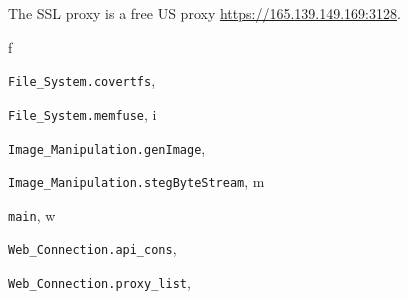\documentclass[letterpaper,10pt,english]{sphinxmanual}
\begin{document}
\begin{fulllineitems}
\label{Web_Connection:Web_Connection.proxy_list.ssl_proxy}
The SSL proxy is a free US proxy \href{https://165.139.149.169:3128}{https://165.139.149.169:3128}.

\end{fulllineitems}



\renewcommand{\indexname}{Python Module Index}
\begin{theindex}
\def\bigletter#1{{\Large\sffamily#1}\nopagebreak\vspace{1mm}}
\bigletter{f}
\item {\texttt{File\_System.covertfs}}, \pageref{File_System:module-File_System.covertfs}
\item {\texttt{File\_System.memfuse}}, \pageref{File_System:module-File_System.memfuse}
\indexspace
\bigletter{i}
\item {\texttt{Image\_Manipulation.genImage}}, \pageref{Image_Manipulation:module-Image_Manipulation.genImage}
\item {\texttt{Image\_Manipulation.stegByteStream}}, \pageref{Image_Manipulation:module-Image_Manipulation.stegByteStream}
\indexspace
\bigletter{m}
\item {\texttt{main}}, \pageref{main:module-main}
\indexspace
\bigletter{w}
\item {\texttt{Web\_Connection.api\_cons}}, \pageref{Web_Connection:module-Web_Connection.api_cons}
\item {\texttt{Web\_Connection.proxy\_list}}, \pageref{Web_Connection:module-Web_Connection.proxy_list}
\end{theindex}

\renewcommand{\indexname}{Index}
\printindex
\end{document}
